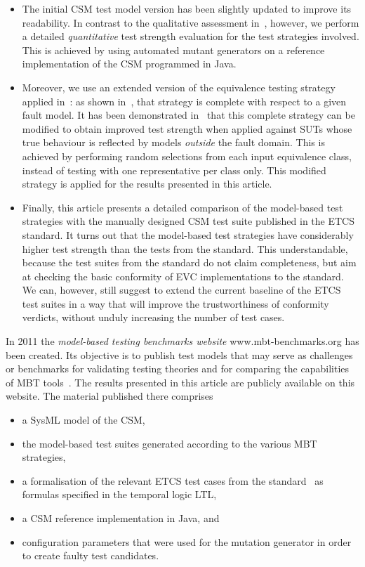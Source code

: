 \begin{itemize}
\item The initial CSM test model version has been slightly updated to improve
its readability. In contrast to the qualitative assessment
 in~\cite{peleska_csm_2014}, however, we perform a detailed 
{\it quantitative}  test strength evaluation for the test strategies involved. This is achieved 
by using automated mutant generators on a reference implementation of the CSM programmed in Java.

\item Moreover, we use an extended version of the equivalence testing strategy   applied
in~\cite{peleska_csm_2014}: as shown in~\cite{peleska_sttt_2014}, 
that strategy is complete with respect to a given fault model. 
It has been demonstrated in~\cite{huebner15} that this complete strategy can be
modified   to obtain improved test strength when applied against SUTs whose true behaviour is reflected by  models {\it outside} the fault domain. This is achieved by performing
random selections from each input equivalence class, instead of testing with one representative per class only. This modified strategy is applied for the results presented in
this article.

\item Finally, this article presents a detailed comparison of the model-based test strategies with the manually designed CSM test suite published in the ETCS standard. It turns out that the model-based test strategies  have considerably higher test strength than the tests 
from the standard. This understandable, because the test suites  from the standard 
do not claim completeness, but aim at checking the basic conformity of EVC implementations 
to the standard. We can, however, still suggest to extend the current baseline of the ETCS test suites
in a way that will improve the trustworthiness of conformity verdicts, without unduly increasing the
number of test cases. 
\end{itemize}

In 2011 the {\it model-based testing benchmarks website} www.mbt-benchmarks.org has been 
created. Its objective is to publish test models that may serve as challenges or benchmarks 
for validating testing theories   and for comparing the capabilities of MBT tools~\cite{pel2011a}. 
The results presented in this article are publicly available on this website. The material
published there comprises 
\begin{itemize}
\item a SysML model of the CSM, 
\item the model-based test suites generated
according to the various MBT strategies, 
\item a formalisation of the relevant ETCS test cases from the standard~\cite{ETCS-Subset076}
as formulas specified in the temporal logic LTL,
\item a CSM reference implementation in Java, and
\item configuration parameters that were used for the mutation generator in order to 
create faulty test candidates. 

\end{itemize}

